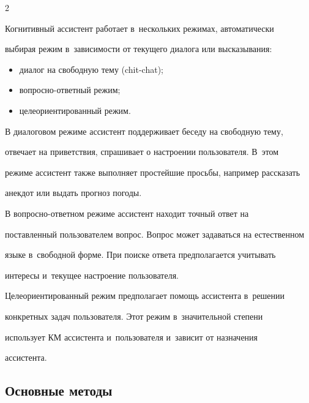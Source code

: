 \begin{multicols}{2}
  


  Когнитивный ассистент работает в~нескольких режимах, автоматически 


выбирая режим в~зависимости от текущего диалога или высказывания:


  \begin{itemize}


\item диалог на свободную тему (chit-chat);


\item вопросно-ответный режим;


\item целеориентированный режим.


\end{itemize}





  В диалоговом режиме ассистент поддерживает беседу на свободную тему, 


отвечает на приветствия, спрашивает о настроении пользователя. В~этом 


режиме ассистент также выполняет простейшие просьбы, например рассказать 


анекдот или выдать прогноз погоды.


  


  В вопросно-ответном режиме ассистент находит точный ответ на 


поставленный пользователем вопрос. Вопрос может задаваться на естественном 


языке в~свободной форме. При поиске ответа предполагается учитывать 


интересы и~текущее настроение пользователя.


  


  Целеориентированный режим предполагает помощь ассистента в~решении 


конкретных задач пользователя. Этот режим в~значительной степени 


использует КМ ассистента и~пользователя и~зависит от назначения 


ассистента.







  


  \subsection{Основные методы} %



\end{multicols}
